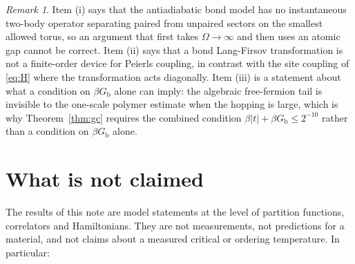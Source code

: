 \documentclass[11pt]{article}
\theoremstyle{definition}
\theoremstyle{remark}
\newtheorem{remark}[theorem]{Remark}
\newcommand{\Gb}{G_{\mathrm{b}}}
\begin{document}
\begin{remark}
Item (i) says that the antiadiabatic bond model has no instantaneous two-body operator
separating paired from unpaired sectors on the smallest allowed torus, so an argument
that first takes $\Omega\to\infty$ and then uses an atomic gap cannot be correct.
Item (ii) says that a bond Lang-Firsov transformation is not a finite-order device for
Peierls coupling, in contrast with the site coupling of \eqref{eq:H} where the
transformation acts diagonally. Item (iii) is a statement about what a condition on
$\beta\Gb$ alone can imply: the algebraic free-fermion tail is invisible to the
one-scale polymer estimate when the hopping is large, which is why
Theorem~\ref{thm:gc} requires the combined condition
$\beta|t|+\beta\Gb\le2^{-10}$ rather than a condition on $\beta\Gb$ alone.
\end{remark}

\section{What is not claimed}
\label{sec:notclaimed}

The results of this note are model statements at the level of partition functions,
correlators and Hamiltonians. They are not measurements, not predictions for a
material, and not claims about a measured critical or ordering temperature. In
particular:
\end{document}
